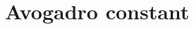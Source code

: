 \hypertarget{group___avogadro_constant}{}\section{Avogadro constant}
\label{group___avogadro_constant}
